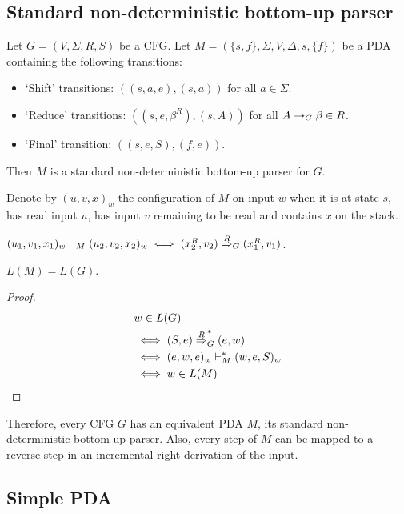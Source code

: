 \subsection{Standard non-deterministic bottom-up parser}

\begin{definition}
Let $G = (V, \Sigma, R, S)$ be a CFG.
Let $M = (\{s, f\}, \Sigma, V, \Delta, s, \{f\})$ be a PDA
containing the following transitions:
\begin{itemize}
\item `Shift' transitions: $((s, a, e), (s, a))$ for all $a \in \Sigma$.
\item `Reduce' transitions: $((s, e, \beta^R), (s, A))$ for all $A \rightarrow_{G} \beta \in R$.
\item `Final' transition: $((s, e, S), (f, e))$.
\end{itemize}
Then $M$ is a standard non-deterministic bottom-up parser for $G$.
\end{definition}

Denote by $(u, v, x)_w$ the configuration of $M$ on input $w$ when it is at state $s$,
has read input $u$, has input $v$ remaining to be read and contains $x$ on the stack.

\begin{theorem}
$(u_1, v_1, x_1)_w \vdash_M (u_2, v_2, x_2)_w \iff (x_2^R, v_2) \overset{R}{\Rightarrow}_{G} (x_1^R, v_1)$.
\end{theorem}
\begin{theorem}$L(M) = L(G)$.\end{theorem}
\begin{proof}
\begin{align*}
& w \in L(G)
\\ &\iff (S, e) \overset{R}{\Rightarrow}_{G}^* (e, w)
\\ &\iff (e, w, e)_w \vdash_M^* (w, e, S)_w
\\ &\iff w \in L(M)
\end{align*}
\end{proof}

Therefore, every CFG $G$ has an equivalent PDA $M$, its standard non-deterministic bottom-up parser.
Also, every step of $M$ can be mapped to a reverse-step in an incremental right derivation of the input.

\subsection{Simple PDA}

